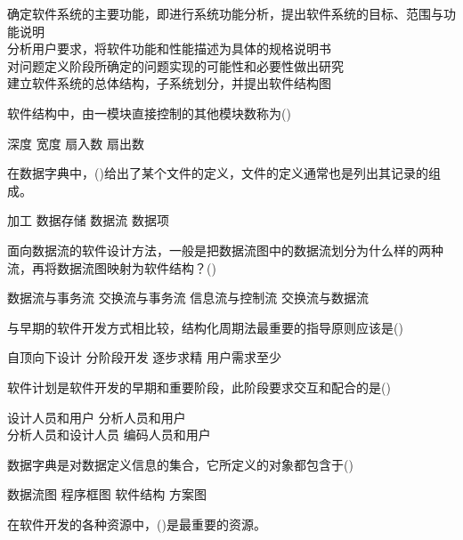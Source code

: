 \documentclass{exam}
\begin{document}
\begin{questions}
	\begin{oneparchoices}
		\choice 确定软件系统的主要功能，即进行系统功能分析，提出软件系统的目标、范围与功能说明\\
		\choice 分析用户要求，将软件功能和性能描述为具体的规格说明书\\
		\choice 对问题定义阶段所确定的问题实现的可能性和必要性做出研究\\
		\correctchoice 建立软件系统的总体结构，子系统划分，并提出软件结构图
	\end{oneparchoices}
	\question 软件结构中，由一模块直接控制的其他模块数称为()\\
	\begin{oneparchoices}
		\choice 深度
		\choice 宽度
		\choice 扇入数
		\correctchoice 扇出数
	\end{oneparchoices}
	\question 在数据字典中，()给出了某个文件的定义，文件的定义通常也是列出其记录的组成。\\
	\begin{oneparchoices}
		\choice 加工
		\correctchoice 数据存储
		\choice 数据流
		\choice 数据项
	\end{oneparchoices}
	\question 面向数据流的软件设计方法，一般是把数据流图中的数据流划分为什么样的两种流，再将数据流图映射为软件结构？()\\
	\begin{oneparchoices}
		\choice 数据流与事务流
		\correctchoice 交换流与事务流
		\choice 信息流与控制流
		\choice 交换流与数据流
	\end{oneparchoices}
	\question 与早期的软件开发方式相比较，结构化周期法最重要的指导原则应该是()\\
	\begin{oneparchoices}
		\choice 自顶向下设计
		\correctchoice 分阶段开发
		\choice 逐步求精
		\choice 用户需求至少
	\end{oneparchoices}
	\question 软件计划是软件开发的早期和重要阶段，此阶段要求交互和配合的是()\\
	\begin{oneparchoices}
		\choice 设计人员和用户
		\correctchoice 分析人员和用户\\
		\choice 分析人员和设计人员
		\choice 编码人员和用户
	\end{oneparchoices}
	\question 数据字典是对数据定义信息的集合，它所定义的对象都包含于()\\
	\begin{oneparchoices}
		\correctchoice 数据流图
		\choice 程序框图
		\choice 软件结构
		\choice 方案图
	\end{oneparchoices}
	\question 在软件开发的各种资源中，()是最重要的资源。\\

\end{questions}
\end{document}
